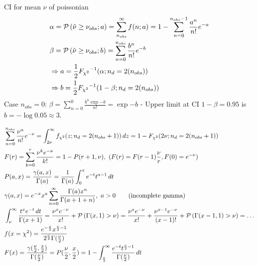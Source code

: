 \documentclass[asd-beamer.tex]{subfiles}%
\begin{document}
\begin{frame}{CI for mean $\nu$ of poissonian}
    \begin{align*}
        &\alpha=\operatorname{\mathcal{P}}{(\hat{\nu}\geq\nu_{obs};a)}=\sum_{n_{obs}}^{\infty}f(n;a)=1-\sum_{n=0}^{n_{obs}-1}\frac{a^n}{n!}e^{-a}\\
        &\beta=\operatorname{\mathcal{P}}{(\hat{\nu}\geq\nu_{obs};b)}=\sum_{n=0}^{n_{obs}}\frac{b^n}{n!}e^{-b}\\
        &\Rightarrow a=\frac{1}{2}{F_{\chi^2}}^{-1}(\alpha;n_d=2(n_{obs}))\\
        &\Rightarrow b=\frac{1}{2}{F_{\chi^2}}^{-1}(1-\beta;n_d=2(n_{obs}))
    \end{align*}
    Case $n_{obs}=0$: $\beta=\sum_{n=0}^0 \frac{b^n\exp{-b}}{n!}=\exp{-b}$ - Upper limit at CI $1-\beta=0.95$ is $b=-\log{0.05}\approx3$.
\end{frame}

    \begin{frame}{}
        \begin{align*}
            &\sum_{n=0}^{n_{obs}}\frac{\nu^n}{n!}e^{-\nu}=\int_{2\nu}^{\infty}f_{\chi^2}(z;n_d=2(n_{obs}+1))\,dz=1-F_{\chi^2}(2\nu;n_d=2(n_{obs}+1))\\
            &F(r)=\sum_{k=0}^r \frac{\nu^ke^{-\nu}}{k!}=1-P(r+1,\nu),\ (F(r)=F(r-1)\frac{\nu}{r}, F(0)=e^{-\nu})\\
            &P(a,x)=\frac{\gamma(a,x)}{\Gamma(a)}=\frac{1}{\Gamma(a)}\int_0^{x}e^{-t}t^{a-1}\,dt\\
            &\gamma(a,x)=e^{-x}x^a\sum_{n=0}^{\infty}\frac{\Gamma(a)x^n}{\Gamma(a+1+n)},\ a>0\tag{incomplete gamma}\\
            &\int_{\nu}^{\infty}\frac{t^xe^{-t}\,dt}{\Gamma(x+1)}=\frac{\nu^xe^{-\nu}}{x!}+\operatorname{\mathcal{P}}{(\Gamma(x,1)>\nu)}=\frac{\nu^xe^{-\nu}}{x!}+\frac{\nu^{x-1}e^{-\nu}}{(x-1)!}+\operatorname{\mathcal{P}}{(\Gamma(x-1,1)>\nu)}=\ldots\\
        &f(x=\chi^2)=\frac{e^{-\frac{x}{2}}x^{\frac{\nu}{2}-1}}{2^{\frac{\nu}{2}}\Gamma(\frac{\nu}{2})}\\
        &F(x)=\frac{\gamma(\frac{\nu}{2},\frac{x}{2})}{\Gamma(\frac{\nu}{2})}=P(\frac{\nu}{2},\frac{x}{2})=1-\int_{\frac{x}{2}}^{\infty}\frac{e^{-t}t^{\frac{\nu}{2}-1}}{\Gamma(\frac{\nu}{2})}\,dt
        \end{align*}
    \end{frame}
\end{document}
